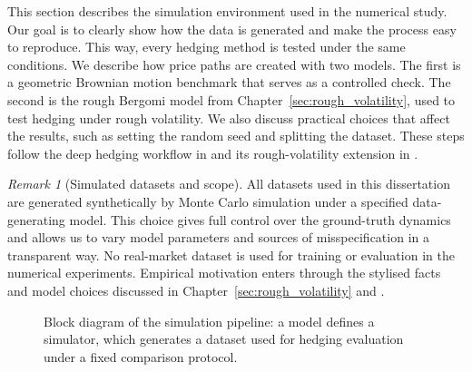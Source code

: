 \documentclass[12pt,a4paper]{article}
\theoremstyle{definition}
\theoremstyle{plain}
\theoremstyle{remark}
\newtheorem{remark}{Remark}[section]
\theoremstyle{plain}
\begin{document}
This section describes the simulation environment used in the numerical study.
Our goal is to clearly show how the data is generated and make the process easy to reproduce. This way, every hedging method is tested under the same conditions.
We describe how price paths are created with two models. The first is a geometric Brownian motion benchmark that serves as a controlled check. The second is the rough Bergomi model from Chapter~\ref{sec:rough_volatility}, used to test hedging under rough volatility.
We also discuss practical choices that affect the results, such as setting the random seed and splitting the dataset. These steps follow the deep hedging workflow in \cite{Buehler2019DeepHedging} and its rough-volatility extension in \cite{Horvath2021DeepRough}.

\begin{remark}[Simulated datasets and scope]
\label{rem:sim_vs_real_data}
All datasets used in this dissertation are generated synthetically by Monte Carlo simulation under a specified data-generating model. This choice gives full control over the ground-truth dynamics and allows us to vary model parameters and sources of misspecification in a transparent way.
No real-market dataset is used for training or evaluation in the numerical experiments. Empirical motivation enters through the stylised facts and model choices discussed in Chapter~\ref{sec:rough_volatility} \cite{GatheralRough} and \cite{BayerFriz2016}.
\end{remark}

\begin{figure}[H]
\centering
{}
\caption{Block diagram of the simulation pipeline: a model defines a simulator, which generates a dataset used for hedging evaluation under a fixed comparison protocol.}
\label{fig:sim_pipeline_block}
\end{figure}
\end{document}
